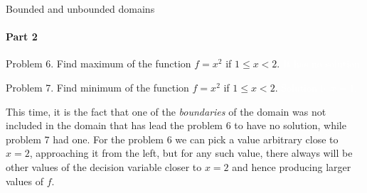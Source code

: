 \documentclass{beamer}
\begin{document}
\begin{frame}{Bounded and unbounded domains}
	\framesubtitle{Part 2}
	\begin{flushleft}
		
		Problem 6. Find maximum of the function $f = x^2$ if $1 \leq x < 2$. \textcolor{white}{It has no solution.}
		
		\bigskip
		
		Problem 7. Find minimum of the function $f = x^2$ if $1 \leq x < 2$. \textcolor{white}{Solution is $x = 1$.}
		
		\bigskip
		
		This time, it is the fact that one of the \emph{boundaries} of the domain was not included in the domain that has lead the problem 6 to have no solution, while problem 7 had one. For the problem 6 we can pick a value arbitrary close to $x = 2$, approaching it from the left, but for any such value, there always will be other values of the decision variable closer to $x = 2$ and hence producing larger values of $f$.
		
	\end{flushleft}
\end{frame}
\end{document}
